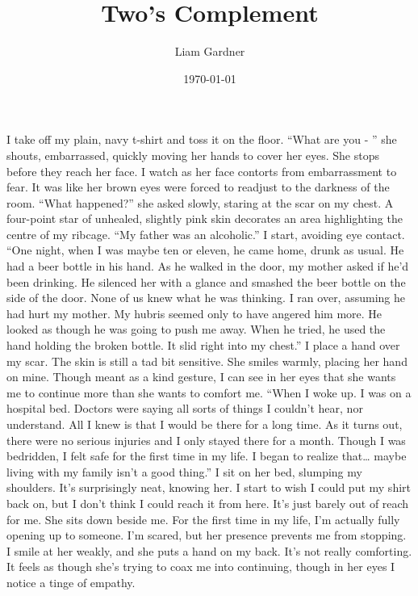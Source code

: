 \documentclass[a4paper, 12pt]{book}
\title{Two's Complement}
\author{Liam Gardner}
\date{\today}
\newcommand\tab[1][1cm]{\hspace*{#1}}
\begin{document}
\maketitle
\tab
I take off my plain, navy t-shirt and toss it on the floor. “What are you - \textinterrobang” she shouts, embarrassed, quickly moving her hands to cover her eyes. She stops before they reach her face. I watch as her face contorts from embarrassment to fear. It was like her brown eyes were forced to readjust to the darkness of the room. “What happened?” she asked slowly, staring at the scar on my chest. A four-point star of unhealed, slightly pink skin decorates an area highlighting the centre of my ribcage.
\newline
\tab
“My father was an alcoholic.” I start, avoiding eye contact. “One night, when I was maybe ten or eleven, he came home, drunk as usual. He had a beer bottle in his hand. As he walked in the door, my mother asked if he’d been drinking. He silenced her with a glance and smashed the beer bottle on the side of the door. None of us knew what he was thinking. I ran over, assuming he had hurt my mother. My hubris seemed only to have angered him more. He looked as though he was going to push me away. When he tried, he used the hand holding the broken bottle. It slid right into my chest.” I place a hand over my scar. The skin is still a tad bit sensitive. She smiles warmly, placing her hand on mine. Though meant as a kind gesture, I can see in her eyes that she wants me to continue more than she wants to comfort me.
\newline
\tab
“When I woke up. I was on a hospital bed. Doctors were saying all sorts of things I couldn’t hear, nor understand. All I knew is that I would be there for a long time. As it turns out, there were no serious injuries and I only stayed there for a month. Though I was bedridden, I felt safe for the first time in my life. I began to realize that… maybe living with my family isn’t a good thing.” I sit on her bed, slumping my shoulders. It’s surprisingly neat, knowing her. I start to wish I could put my shirt back on, but I don’t think I could reach it from here. It’s just barely out of reach for me. She sits down beside me. For the first time in my life, I’m actually fully opening up to someone. I’m scared, but her presence prevents me from stopping. I smile at her weakly, and she puts a hand on my back. It’s not really comforting. It feels as though she’s trying to coax me into continuing, though in her eyes I notice a tinge of empathy.
\newline
\end{document}
